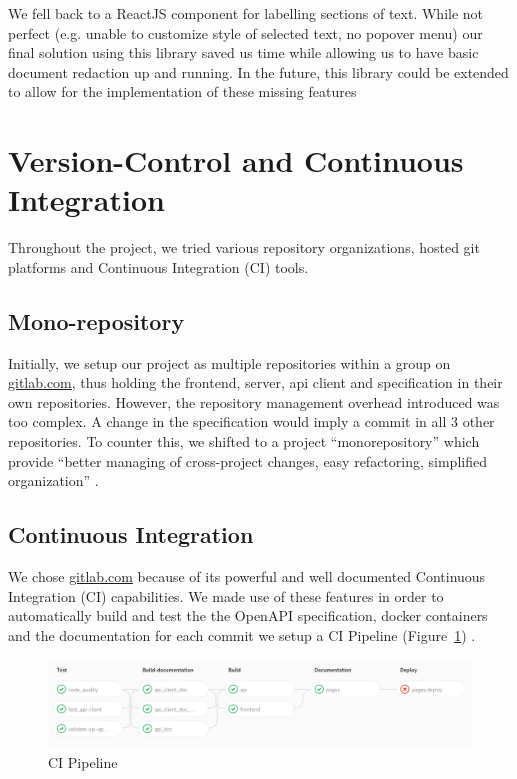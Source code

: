 \documentclass[\version]{l4proj}
\begin{document}
We fell back to \textcite{camachoMcamacReacttextannotate2020} a ReactJS component for labelling sections of text.
While not perfect (e.g. unable to customize style of selected text, no popover menu) our final solution using this library saved us time while allowing us to have basic document redaction up and running.
In the future, this library could be extended to allow for the implementation of these missing features

\section{Version-Control and Continuous Integration}

Throughout the project, we tried various repository organizations, hosted git platforms and Continuous Integration (CI) tools.

\subsection{Mono-repository}

Initially, we setup our project as multiple repositories within a group on \href{https://gitlab.com/harpocrates-app}{gitlab.com}, thus holding the frontend, server, api client and specification in their own repositories.
However, the repository management overhead introduced was too complex. A change in the specification would imply a commit in all 3 other repositories.
To counter this, we shifted to a project ``monorepository'' which provide ``better managing of cross-project changes, easy refactoring, simplified organization'' \autocite[1]{britoMonoreposMultivocalLiterature2018}.

\subsection{Continuous Integration}

We chose \href{https://gitlab.com/}{gitlab.com} because of its powerful and well documented Continuous Integration (CI) capabilities.
We made use of these features in order to automatically build and test the the OpenAPI specification, docker containers and the documentation for each commit we setup a CI Pipeline (Figure~\ref{fig:ci}) .

\begin{figure}[H]
    \centering
    \includegraphics[width=0.9\linewidth]{figures/ci.png}
    \caption{CI Pipeline}\label{fig:ci}
\end{figure}
\end{document}

